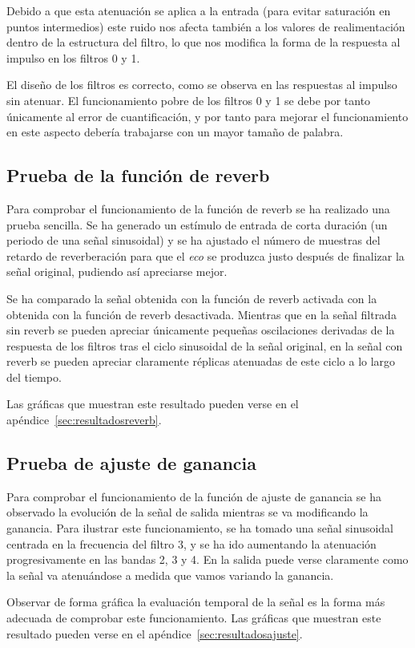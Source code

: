 \documentclass[a4paper,12pt]{article}
\begin{document}
Debido a que esta atenuación se aplica a la entrada (para evitar saturación en puntos intermedios) este ruido nos afecta también a los valores de realimentación dentro de la estructura del filtro, lo que nos modifica la forma de la respuesta al impulso en los filtros 0 y 1.

El diseño de los filtros es correcto, como se observa en las respuestas al impulso sin atenuar. El funcionamiento pobre de los filtros 0 y 1 se debe por tanto únicamente al error de cuantificación, y por tanto para mejorar el funcionamiento en este aspecto debería trabajarse con un mayor tamaño de palabra.


\subsection{Prueba de la función de reverb}
Para comprobar el funcionamiento de la función de reverb se ha realizado una prueba sencilla. Se ha generado un estímulo de entrada de corta duración (un periodo de una señal sinusoidal) y se ha ajustado el número de muestras del retardo de reverberación para que el \emph{eco} se produzca justo después de finalizar la señal original, pudiendo así apreciarse mejor.

Se ha comparado la señal obtenida con la función de reverb activada con la obtenida con la función de reverb desactivada. Mientras que en la señal filtrada sin reverb se pueden apreciar únicamente pequeñas oscilaciones derivadas de la respuesta de los filtros tras el ciclo sinusoidal de la señal original, en la señal con reverb se pueden apreciar claramente réplicas atenuadas de este ciclo a lo largo del tiempo.

Las gráficas que muestran este resultado pueden verse en el apéndice~\ref{sec:resultadosreverb}.


\subsection{Prueba de ajuste de ganancia}
Para comprobar el funcionamiento de la función de ajuste de ganancia se ha observado la evolución de la señal de salida mientras se va modificando la ganancia. Para ilustrar este funcionamiento, se ha tomado una señal sinusoidal centrada en la frecuencia del filtro 3, y se ha ido aumentando la atenuación progresivamente en las bandas 2, 3 y 4. En la salida puede verse claramente como la señal va atenuándose a medida que vamos variando la ganancia.

Observar de forma gráfica la evaluación temporal de la señal es la forma más adecuada de comprobar este funcionamiento. Las gráficas que muestran este resultado pueden verse en el apéndice~\ref{sec:resultadosajuste}.
\end{document}
